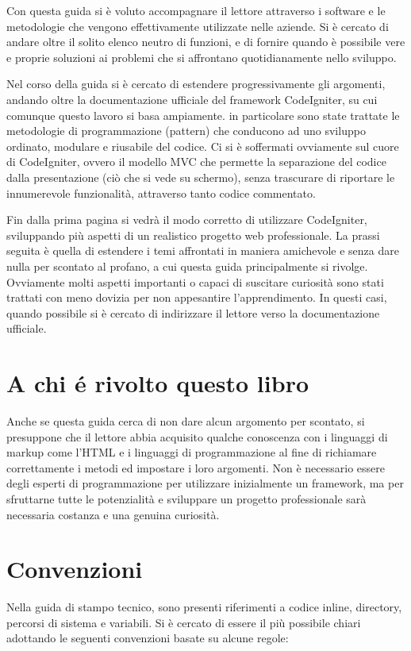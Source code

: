 Con questa guida si è voluto accompagnare il lettore attraverso i software e le metodologie che vengono effettivamente utilizzate nelle aziende. Si è cercato di andare oltre il solito elenco neutro di funzioni, e di fornire quando è possibile vere e proprie soluzioni ai problemi che si affrontano quotidianamente nello sviluppo.

Nel corso della guida si è cercato di estendere progressivamente gli argomenti, andando oltre la documentazione ufficiale del framework CodeIgniter, su cui comunque questo lavoro si basa ampiamente. in particolare sono state trattate le metodologie di programmazione (pattern) che conducono ad uno sviluppo ordinato, modulare e riusabile del codice. Ci si è soffermati ovviamente sul cuore di CodeIgniter, ovvero il modello \ac{MVC} che permette la separazione del codice dalla presentazione (ciò che si vede su schermo), senza trascurare di riportare le innumerevole funzionalità, attraverso tanto codice commentato.

Fin dalla prima pagina si vedrà il modo corretto di utilizzare CodeIgniter, sviluppando più aspetti di un realistico progetto web professionale. La prassi seguita è quella di estendere i temi affrontati in maniera amichevole e senza dare nulla per scontato al profano, a cui questa guida principalmente si rivolge. Ovviamente molti aspetti importanti o capaci di suscitare curiosità sono stati trattati con meno dovizia per non appesantire l'apprendimento. In questi casi, quando possibile si è cercato di indirizzare il lettore verso la documentazione ufficiale.

\section*{A chi \'e rivolto questo libro}
Anche se questa guida cerca di non dare alcun argomento per scontato, si presuppone che il lettore abbia acquisito qualche conoscenza con i linguaggi di markup come l'HTML e i linguaggi di programmazione al fine di richiamare correttamente i metodi ed impostare i loro argomenti. Non è necessario essere degli esperti di programmazione per utilizzare inizialmente un framework, ma per  sfruttarne tutte le potenzialità e sviluppare un progetto professionale sarà necessaria costanza e una genuina curiosità.

\section*{Convenzioni}
Nella guida di stampo tecnico, sono presenti riferimenti a codice inline, directory, percorsi di sistema e variabili. Si è cercato di essere il più possibile chiari adottando le seguenti convenzioni basate su alcune regole:

